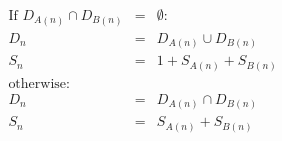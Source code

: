 \begin{eqnarray*}
\mbox{If } D_{A(n)} \cap D_{B(n)} & = & \emptyset :\\
D_n &=& D_{A(n)} \cup D_{B(n)} \\
S_n & = & 1 + S_{A(n)}  + S_{B(n)} \\
\mbox{otherwise} : && \\
D_n &=& D_{A(n)} \cap D_{B(n)} \\
S_n & = &  S_{A(n)}  + S_{B(n)} \\
\end{eqnarray*}

